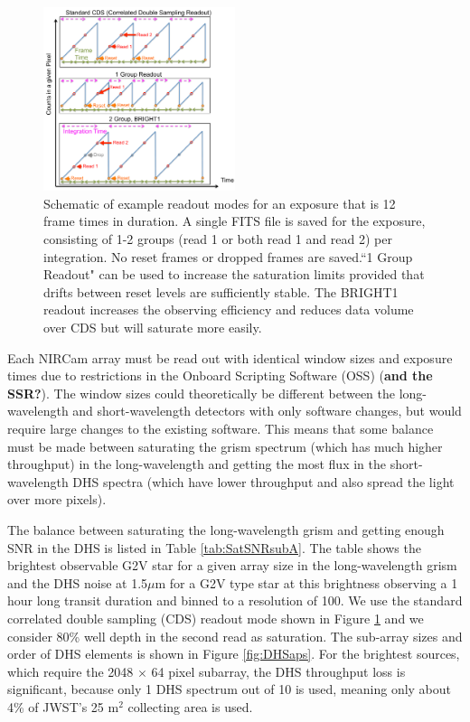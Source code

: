 \documentclass[iop]{emulateapj}
\begin{document}
\begin{figure}
\centering
\includegraphics[width=0.5\textwidth]{readout_schematic.pdf}
\caption{Schematic of example readout modes for an exposure that is 12 frame times in duration.
A single FITS file is saved for the exposure, consisting of 1-2 groups (read 1 or both read 1 and read 2) per integration.
No reset frames or dropped frames are saved.``1 Group Readout" can be used to increase the saturation limits provided that drifts between reset levels are sufficiently stable.
The BRIGHT1 readout increases the observing efficiency and reduces data volume over CDS but will saturate more easily.}\label{fig:readout}
\end{figure}

Each NIRCam array must be read out with identical window sizes and exposure times due to restrictions in the Onboard Scripting Software (OSS) (\textbf{and the SSR?}).
The window sizes could theoretically be different between the long-wavelength and short-wavelength detectors with only software changes, but would require large changes to the existing software.
This means that some balance must be made between saturating the grism spectrum (which has much higher throughput) in the long-wavelength and getting the most flux in the short-wavelength DHS spectra (which have lower throughput and also spread the light over more pixels).

The balance between saturating the long-wavelength grism and getting enough SNR in the DHS is listed in Table \ref{tab:SatSNRsubA}.
The table shows the brightest observable G2V star  for a given array size in the long-wavelength grism and the DHS noise at 1.5$\mu$m for a G2V type star at this brightness observing a 1 hour long transit duration and binned to a resolution of 100.
We use the standard correlated double sampling (CDS) readout mode shown in Figure \ref{fig:readout} and we consider 80\% well depth in the second read as saturation.
The sub-array sizes and order of DHS elements is shown in Figure \ref{fig:DHSaps}.
For the brightest sources, which require the 2048 $\times$ 64 pixel subarray, the DHS throughput loss is significant, because only 1 DHS spectrum out of 10 is used, meaning only about 4\% of JWST's 25 m$^2$ collecting area is used.
\end{document}
